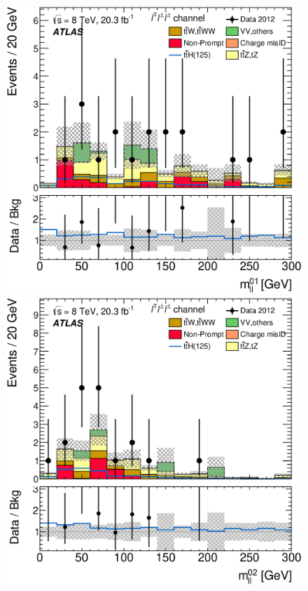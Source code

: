 \begin{figure}[!htbp]
  \begin{minipage}[h]{0.4\textwidth}
    \centering \includegraphics[width=\textwidth]{figs/results/results_new/3lep_SR_SortLepPair01Mll}
  \end{minipage}\hfill
  \begin{minipage}[h]{0.4\textwidth}
    \centering \includegraphics[width=\textwidth]{figs/results/results_new/3lep_SR_SortLepPair02Mll}

\end{minipage}
\end{figure}
